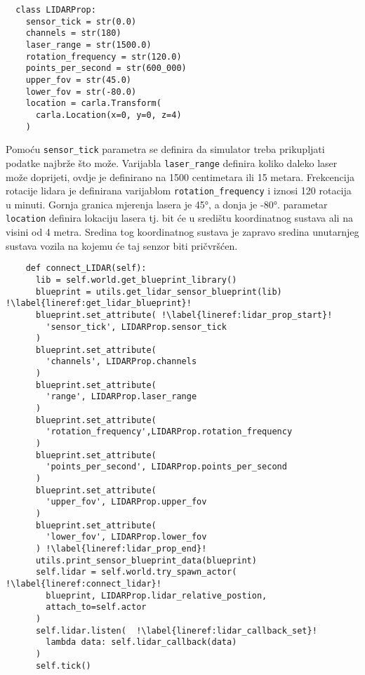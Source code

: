 \begin{listing}[h!]
  \begin{verbatim}
  class LIDARProp:
    sensor_tick = str(0.0)
    channels = str(180)
    laser_range = str(1500.0)
    rotation_frequency = str(120.0)
    points_per_second = str(600_000)
    upper_fov = str(45.0)
    lower_fov = str(-80.0)
    location = carla.Transform(
      carla.Location(x=0, y=0, z=4)
    )
  \end{verbatim}
  \caption{LIDAR atributi}
  \label{coderef:lidar_props}
\end{listing}
\pagebreak
Pomoću \texttt{sensor_tick} parametra se definira da simulator treba  prikupljati podatke najbrže što može. Varijabla \texttt{laser_range} definira koliko daleko laser može doprijeti, ovdje je definirano na 1500 centimetara ili 15 metara. Frekcencija rotacije lidara je definirana varijablom \texttt{rotation_frequency} i iznosi 120 rotacija u minuti. Gornja granica mjerenja lasera je 45°, a donja je -80°. parametar \texttt{location} definira lokaciju lasera tj. bit će u središtu koordinatnog sustava ali na visini od 4 metra. Sredina tog koordinatnog sustava je zapravo sredina unutarnjeg sustava vozila na kojemu će taj senzor biti pričvršćen.

\begin{listing}[h!]
  \begin{verbatim}
    def connect_LIDAR(self):
      lib = self.world.get_blueprint_library()
      blueprint = utils.get_lidar_sensor_blueprint(lib) !\label{lineref:get_lidar_blueprint}!
      blueprint.set_attribute( !\label{lineref:lidar_prop_start}!
        'sensor_tick', LIDARProp.sensor_tick
      )
      blueprint.set_attribute(
        'channels', LIDARProp.channels
      )
      blueprint.set_attribute(
        'range', LIDARProp.laser_range
      )
      blueprint.set_attribute(
        'rotation_frequency',LIDARProp.rotation_frequency
      )
      blueprint.set_attribute(
        'points_per_second', LIDARProp.points_per_second
      )
      blueprint.set_attribute(
        'upper_fov', LIDARProp.upper_fov
      )
      blueprint.set_attribute(
        'lower_fov', LIDARProp.lower_fov
      ) !\label{lineref:lidar_prop_end}!
      utils.print_sensor_blueprint_data(blueprint)
      self.lidar = self.world.try_spawn_actor(  !\label{lineref:connect_lidar}!
        blueprint, LIDARProp.lidar_relative_postion,
        attach_to=self.actor
      )
      self.lidar.listen(  !\label{lineref:lidar_callback_set}!
        lambda data: self.lidar_callback(data)
      )
      self.tick()
  \end{verbatim}
  \caption{Stvaranje LIDAR senzora}
  \label{coderef:lidar_find_spawn}
\end{listing}

